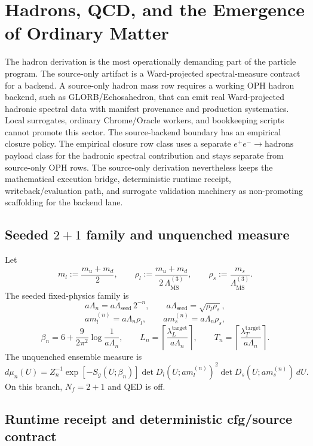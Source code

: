 \documentclass[11pt]{article}
\begin{document}
\section{Hadrons, QCD, and the Emergence of Ordinary Matter}

The hadron derivation is the most operationally demanding part of the particle program. The
source-only artifact is a Ward-projected spectral-measure contract for a backend. A source-only
hadron mass row requires a working OPH hadron backend, such as GLORB/Echosahedron, that can emit
real Ward-projected hadronic spectral data with manifest provenance and production systematics.
Local surrogates, ordinary Chrome/Oracle workers, and bookkeeping scripts cannot promote this
sector. The source-backend boundary has an empirical closure policy. The empirical closure row class uses a separate
\(e^+e^-\to\mathrm{hadrons}\) payload class for the hadronic spectral contribution and stays
separate from source-only OPH rows. The
source-only derivation nevertheless keeps the mathematical execution bridge, deterministic runtime
receipt, writeback/evaluation path,
and surrogate validation machinery as non-promoting scaffolding for the backend lane.

\subsection{Seeded \(2+1\) family and unquenched measure}

Let
\[
m_l := \frac{m_u+m_d}{2},
\qquad
\rho_l := \frac{m_u+m_d}{2\,\Lambda_{\overline{\mathrm{MS}}}^{(3)}},
\qquad
\rho_s := \frac{m_s}{\Lambda_{\overline{\mathrm{MS}}}^{(3)}}.
\]
The seeded fixed-physics family is
\[
a\Lambda_n = a\Lambda_{\mathrm{seed}}\,2^{-n},
\qquad
a\Lambda_{\mathrm{seed}} = \sqrt{\rho_l \rho_s},
\]
\[
a m_l^{(n)} = a\Lambda_n \rho_l,
\qquad
a m_s^{(n)} = a\Lambda_n \rho_s,
\]
\[
\beta_n = 6 + \frac{9}{2\pi^2}\log\!\frac{1}{a\Lambda_n},
\qquad
L_n = \left\lceil \frac{\lambda_L^{\mathrm{target}}}{a\Lambda_n}\right\rceil,
\qquad
T_n = \left\lceil \frac{\lambda_T^{\mathrm{target}}}{a\Lambda_n}\right\rceil.
\]
The unquenched ensemble measure is
\[
d\mu_n(U)
=
Z_n^{-1}
\exp[-S_g(U;\beta_n)]
\det D_l(U; a m_l^{(n)})^2
\det D_s(U; a m_s^{(n)})
\,dU.
\]
On this branch, \(N_f=2+1\) and QED is off.

\subsection{Runtime receipt and deterministic cfg/source contract}
\end{document}
